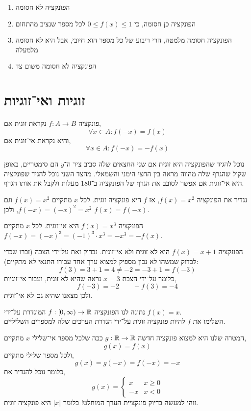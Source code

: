 \begin{solution}
	\begin{enumerate}
		\item הפונקציה לא חסומה
		\item הפונקציה כן חסומה, כי $0 \le f(x) \le 1$ לכל מספר שנציב מהתחום
		\item הפונקציה חסומה מלמטה, הרי ריבוע של כל מספר הוא חיובי, אבל היא לא חסומה מלמעלה
		\item הפונקציה לא חסומה משום צד
	\end{enumerate}
\end{solution}

\section{זוגיות ואי־זוגיות}
\begin{definition}
	פונקציה $f : A \to B$ נקראת זוגית אם,
	\[
		\forall x \in A: f(-x) = f(x)
	\]
	והיא נקראת אי־זוגית אם,
	\[
		\forall x \in A: f(-x) = -f(x)
	\]
\end{definition}
נוכל להגיד שהפונקציה היא זוגית אם שני החצאים שלה סביב ציר ה־$y$ הם סימטריים, באופן שקול שהגרף שלה מהווה מראה בין החצי הימני והשמאלי.
מהצד השני נוכל להגיד שפונקציה היא אי־זוגית אם אפשר לסובב את הגרף של הפונקציה ב־$180$ מעלות ולקבל את אותו הגרף.
\begin{example}
	נגדיר את הפונקציה $f(x) = x^2$, אז $f$ היא פונקציה זוגית.
	לכל $x$ מתקיים $f(x) = x^2$ וגם $f(-x) = {(-x)}^2 = x^2$, ולכן $f(x) = f(-x)$.
\end{example}
\begin{example}
	הפונקציה $f(x) = x^3$ היא אי־זוגית.
	לכל $x$ מתקיים $f(-x) = {(-x)}^3 = {(-1)}^3 \cdot x^3 = -x^3 = -f(x)$.
\end{example}
\begin{example}
	הפונקציה $f(x) = x + 1$ היא לא זוגית ולא אי־זוגית.
	נבדוק זאת על־ידי הצבה (זכרו שכדי לבדוק שמשהו לא נכון מספיק למצוא ערך אחד עבורו התנאי לא מתקיים):
	\[
		f(3)
		= 3 + 1
		= 4
		\ne -2
		= -3 + 1
		= f(-3)
	\]
	כלומר על־ידי הצבת $x = 3$ נראה שהיא לא זוגית, ועבור אי־זוגיות,
	\[
		f(-3)
		= -2
		\qquad
		-f(3)
		= -4
	\]
	ולכן מצאנו שהיא גם לא אי־זוגית.
\end{example}
\begin{exercise}
	נתונה לנו הפונקציה $f : [0, \infty) \to \mathbb{R}$ המוגדרת על־ידי $f(x) = x$. \\
	השלימו את $f$ להיות פונקציה זוגית על־ידי הגדרת הערכים שלה למספרים השליליים.
\end{exercise}
\begin{solution}
	המטרה שלנו היא למצוא פונקציה חדשה $g : \mathbb{R} \to \mathbb{R}$ ככה שלכל מספר אי־שלילי $x$ מתקיים,
	\[
		g(x)
		= f(x)
	\]
	ולכל מספר שלילי מתקיים,
	\[
		g(x)
		= g(-x)
		= f(-x)
		= -x
	\]
	כלומר נוכל להגדיר את,
	\[
		g(x)
		= \begin{cases}
			x & x \ge 0 \\
			-x & x < 0
		\end{cases}
	\]
	זוהי למעשה בדיוק פונקציית הערך המוחלט! כלומר $|x|$ היא פונקציה זוגית.
\end{solution}

